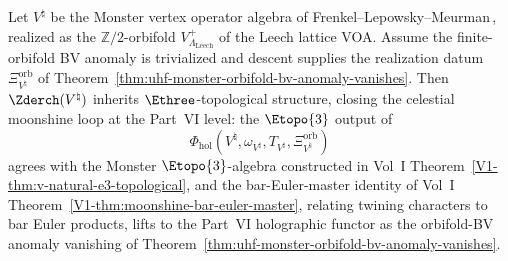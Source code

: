 \begin{theorem}
\label{thm:part-vi-moonshine-recovery}
Let $V^\natural$ be the Monster vertex operator algebra of
Frenkel--Lepowsky--Meurman\,\cite{FLM88}, realized as the
$\mathbb{Z}/2$-orbifold $V_{\Lambda_{\mathrm{Leech}}}^+$ of the Leech
lattice VOA. Assume the finite-orbifold BV anomaly is trivialized and
descent supplies the realization datum
\(\Xi_{V^\natural}^{\mathrm{orb}}\) of
Theorem~\ref{thm:uhf-monster-orbifold-bv-anomaly-vanishes}. Then
$\Zderch(V^\natural)$ inherits
$\Ethree$-topological structure, closing the celestial moonshine loop
at the Part~VI level: the $\Etopo{3}$ output of
\[
\Phi_{\mathrm{hol}}(V^\natural,\omega_{V^\natural},
T_{V^\natural},\Xi_{V^\natural}^{\mathrm{orb}})
\]
agrees with the Monster
$\Etopo{3}$-algebra constructed in
Vol~I Theorem~\ref{V1-thm:v-natural-e3-topological}, and the bar-Euler-master
identity of Vol~I
Theorem~\ref{V1-thm:moonshine-bar-euler-master}, relating twining characters
to bar Euler products, lifts to the Part~VI holographic functor as the
orbifold-BV anomaly vanishing of
Theorem~\ref{thm:uhf-monster-orbifold-bv-anomaly-vanishes}.
\end{theorem}
